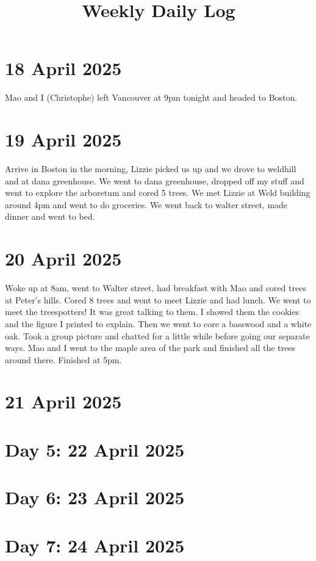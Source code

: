 \documentclass{article}
\begin{document}
\title{Weekly Daily Log}
\date{}
\maketitle

\section*{18 April 2025}
Mao and I (Christophe) left Vancouver at 9pm tonight and headed to Boston. 

\section*{19 April 2025}
Arrive in Boston in the morning, Lizzie picked us up and we drove to weldhill and at dana greenhouse. We went to dana greenhouse, dropped off my stuff and went to explore the arboretum and cored 5 trees. We met Lizzie at Weld building around 4pm and went to do groceries. We went back to walter street, made dinner and went to bed.

\section*{ 20 April 2025}
Woke up at 8am, went to Walter street, had breakfast with Mao and cored trees at Peter's hills. Cored 8 trees and went to meet Lizzie and had lunch. We went to meet the treespotters! It was great talking to them. I showed them the cookies and the figure I printed to explain. Then we went to core a basswood and a white oak. Took a group picture and chatted for a little while before going our separate ways. Mao and I went to the maple area of the park and finished all the trees around there. Finished at 5pm.
\section*{21 April 2025}

\section*{Day 5: 22 April 2025}

\section*{Day 6: 23 April 2025}


\section*{Day 7: 24 April 2025}
\end{document}
